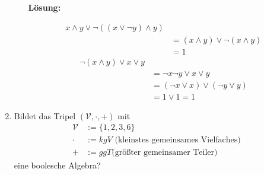 \documentclass[paper=a4,fontsize=11pt]{scrartcl}%
\numberwithin{equation}{section}
\newenvironment{solution}
	{
		\color{Blue}
		\textbf{Lösung:}
	}{}
\begin{document}
\begin{enumerate}
\begin{enumerate}
		\begin{solution}
		\begin{align*}
		x\land y \lor \neg((x \lor \neg y) \land y) &\\
		&= (x \land y) \lor \neg (x \land y)\\
		&= 1
		\end{align*}
		\begin{align*}
		\neg (x \land y) \lor x \lor y &\\
		&= \neg x \neg y \lor x \lor y \\
		&= (\neg x \lor x) \lor (\neg y \lor y)\\
		&= 1 \lor 1 = 1
		\end{align*}
		\end{solution}
	\end{enumerate}
	\item Bildet das Tripel $( \mathcal{V}, \cdot, +)$ mit
	\begin{align*}
		\mathcal{V} & := \{1,2,3,6\}\\
		\cdot 		& := kgV \text{ (kleinstes gemeinsames Vielfaches)}\\
		+ 			& := ggT \text{(größter gemeinsamer Teiler)}
	\end{align*}	
	eine boolesche Algebra?
	

\end{enumerate}
\end{document}
